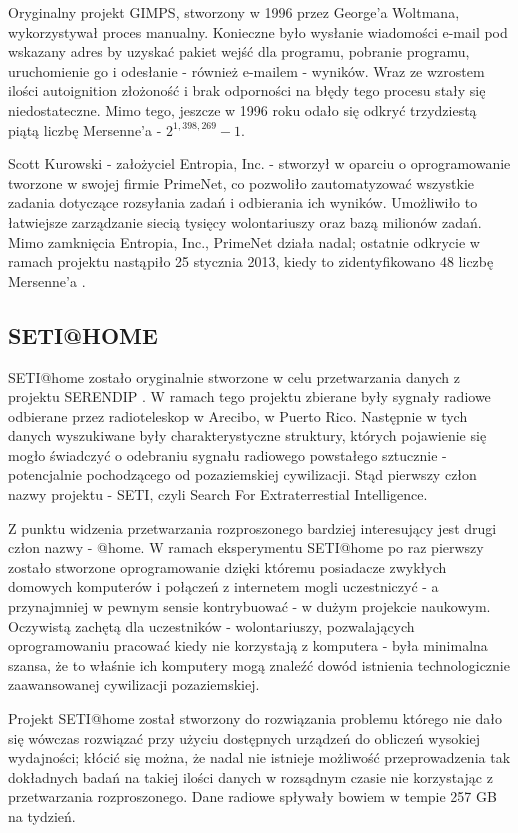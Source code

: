 \documentclass[12pt,a4paper,twoside]{article}
\begin{document}
Oryginalny projekt GIMPS, stworzony w 1996 przez George'a Woltmana, wykorzystywał proces manualny. Konieczne było wysłanie wiadomości e-mail pod wskazany adres by uzyskać pakiet wejść dla programu, pobranie programu, uruchomienie go i odesłanie - również e-mailem - wyników. Wraz ze wzrostem ilości autoignition złożoność i brak odporności na błędy tego procesu stały się niedostateczne. Mimo tego, jeszcze w 1996 roku odało się odkryć trzydziestą piątą liczbę Mersenne'a - $2^{1,398,269}-1$.

Scott Kurowski - założyciel Entropia, Inc. - stworzył w oparciu o oprogramowanie tworzone w swojej firmie PrimeNet, co pozwoliło zautomatyzować wszystkie zadania dotyczące rozsyłania zadań i odbierania ich wyników. Umożliwiło to łatwiejsze zarządzanie siecią tysięcy wolontariuszy oraz bazą milionów zadań. Mimo zamknięcia Entropia, Inc., PrimeNet działa nadal; ostatnie odkrycie w ramach projektu nastąpiło 25 stycznia 2013, kiedy to zidentyfikowano 48 liczbę Mersenne'a \cite{gimps_48}.

\subsection{SETI@HOME}

SETI@home zostało oryginalnie stworzone w celu przetwarzania danych z projektu SERENDIP \cite{seti_serendip}. W ramach tego projektu zbierane były sygnały radiowe odbierane przez radioteleskop w Arecibo, w Puerto Rico. Następnie w tych danych wyszukiwane były charakterystyczne struktury, których pojawienie się mogło świadczyć o odebraniu sygnału radiowego powstałego sztucznie - potencjalnie pochodzącego od pozaziemskiej cywilizacji. Stąd pierwszy człon nazwy projektu - SETI, czyli Search For Extraterrestial Intelligence.

Z punktu widzenia przetwarzania rozproszonego bardziej interesujący jest drugi człon nazwy - @home. W ramach eksperymentu SETI@home po raz pierwszy zostało stworzone oprogramowanie dzięki któremu posiadacze zwykłych domowych komputerów i połączeń z internetem mogli uczestniczyć - a przynajmniej w pewnym sensie kontrybuować - w dużym projekcie naukowym. Oczywistą zachętą dla uczestników - wolontariuszy, pozwalających oprogramowaniu pracować kiedy nie korzystają z komputera - była minimalna szansa, że to właśnie ich komputery mogą znaleźć dowód istnienia technologicznie zaawansowanej cywilizacji pozaziemskiej.

Projekt SETI@home został stworzony do rozwiązania problemu którego nie dało się wówczas rozwiązać przy użyciu dostępnych urządzeń do obliczeń wysokiej wydajności; kłócić się można, że nadal nie istnieje możliwość przeprowadzenia tak dokładnych badań na takiej ilości danych w rozsądnym czasie nie korzystając z przetwarzania rozproszonego. Dane radiowe spływały bowiem w tempie 257 GB na tydzień.
\end{document}
